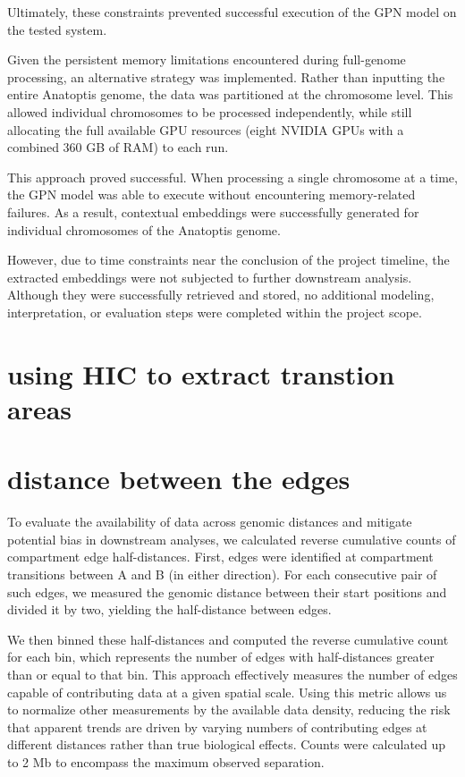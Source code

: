 \documentclass[
  a4paper,
  openany]{scrbook}
\begin{document}
Ultimately, these constraints prevented successful execution of the GPN
model on the tested system.

Given the persistent memory limitations encountered during full-genome
processing, an alternative strategy was implemented. Rather than
inputting the entire Anatoptis genome, the data was partitioned at the
chromosome level. This allowed individual chromosomes to be processed
independently, while still allocating the full available GPU resources
(eight NVIDIA GPUs with a combined 360 GB of RAM) to each run.

This approach proved successful. When processing a single chromosome at
a time, the GPN model was able to execute without encountering
memory-related failures. As a result, contextual embeddings were
successfully generated for individual chromosomes of the Anatoptis
genome.

However, due to time constraints near the conclusion of the project
timeline, the extracted embeddings were not subjected to further
downstream analysis. Although they were successfully retrieved and
stored, no additional modeling, interpretation, or evaluation steps were
completed within the project scope.

\section{using HIC to extract transtion
areas}\label{using-hic-to-extract-transtion-areas}

\section{distance between the edges}\label{distance-between-the-edges}

To evaluate the availability of data across genomic distances and
mitigate potential bias in downstream analyses, we calculated reverse
cumulative counts of compartment edge half-distances. First, edges were
identified at compartment transitions between A and B (in either
direction). For each consecutive pair of such edges, we measured the
genomic distance between their start positions and divided it by two,
yielding the half-distance between edges.

We then binned these half-distances and computed the reverse cumulative
count for each bin, which represents the number of edges with
half-distances greater than or equal to that bin. This approach
effectively measures the number of edges capable of contributing data at
a given spatial scale. Using this metric allows us to normalize other
measurements by the available data density, reducing the risk that
apparent trends are driven by varying numbers of contributing edges at
different distances rather than true biological effects. Counts were
calculated up to 2 Mb to encompass the maximum observed separation.
\end{document}
